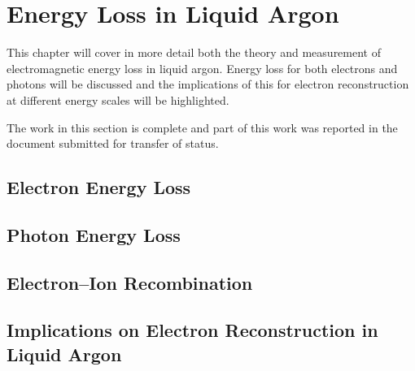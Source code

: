 \chapter{\label{ch:4-energyloss}Energy Loss in Liquid Argon} 


This chapter will cover in more detail both the theory and measurement of
electromagnetic energy loss in liquid argon. Energy loss for both electrons and
photons will be discussed and the implications of this for electron
reconstruction at different energy scales will be highlighted. 

The work in this section is complete and part of this work was reported in the
document submitted for transfer of status.

\section{Electron Energy Loss}
\section{Photon Energy Loss}
\section{Electron--Ion Recombination}
\section{Implications on Electron Reconstruction in Liquid Argon}
